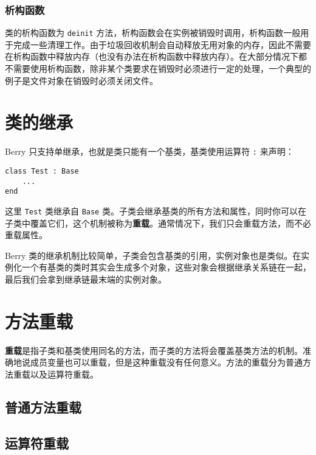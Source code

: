 \subsubsection{析构函数}

类的析构函数为 \texttt{deinit} 方法，析构函数会在实例被销毁时调用，析构函数一般用于完成一些清理工作。由于垃圾回收机制会自动释放无用对象的内存，因此不需要在析构函数中释放内存（也没有办法在析构函数中释放内存）。在大部分情况下都不需要使用析构函数，除非某个类要求在销毁时必须进行一定的处理，一个典型的例子是文件对象在销毁时必须关闭文件。

\section{类的继承}

Berry 只支持单继承，也就是类只能有一个基类，基类使用运算符 \texttt{:} 来声明：
\begin{lstlisting}[language=berry, numbers=none]
class Test : Base
    ...
end
\end{lstlisting}
这里 \texttt{Test} 类继承自 \texttt{Base} 类。子类会继承基类的所有方法和属性，同时你可以在子类中覆盖它们，这个机制被称为\textbf{重载}。通常情况下，我们只会重载方法，而不必重载属性。

Berry 类的继承机制比较简单，子类会包含基类的引用，实例对象也是类似。在实例化一个有基类的类时其实会生成多个对象，这些对象会根据继承关系链在一起，最后我们会拿到继承链最末端的实例对象。

\section{方法重载}

\textbf{重载}是指子类和基类使用同名的方法，而子类的方法将会覆盖基类方法的机制。准确地说成员变量也可以重载，但是这种重载没有任何意义。方法的重载分为普通方法重载以及运算符重载。

\subsection{普通方法重载}

\subsection{运算符重载}


